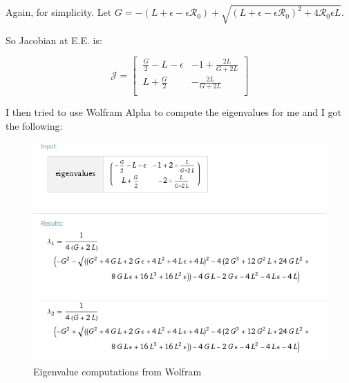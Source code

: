 \documentclass[12pt]{article}
\begin{document}
Again, for simplicity. Let $G=-(L+\epsilon-\epsilon\mathcal{R}_0)+\sqrt{(L+\epsilon-\epsilon\mathcal{R}_0)^2+4\mathcal{R}_0\epsilon L}$.

So Jacobian at E.E. is:

\begin{equation}
\mathcal{J} =
\begin{bmatrix}
    \ \frac{G}{2}-L-\epsilon       & -1+\frac{2L}{G+2L} \\
    \ L+\frac{G}{2}       & -\frac{2L}{G+2L} \\
\end{bmatrix}
\end{equation}

I then tried to use Wolfram Alpha to compute the eigenvalues for me and I got the following:

\begin{figure}[h!]
  \caption{Eigenvalue computations from Wolfram}
  \centering
  \includegraphics[width=1\textwidth] {Figures/Eigenvalues.png}
\end{figure}
\end{document}

